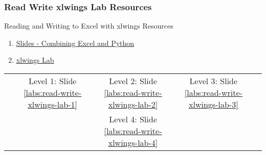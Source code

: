\documentclass[handout, 11pt]{beamer}
\begin{document}
\begin{frame}
\frametitle{Read Write xlwings Lab Resources}
{
\begin{block}{Reading and Writing to Excel with xlwings Resources}
\begin{enumerate}
\item \textcolor{blue}{\underline{\href{https://nickderobertis.github.io/fin-model-course/\_static/generated/pdfs/S9 Combining Excel and Python.pdf}{Slides - Combining Excel and Python}}}
\item \textcolor{blue}{\underline{\href{https://nickderobertis.github.io/fin-model-course/\_static/Materials for Lab Exercises/Connecting Python and Excel/xlwings/xlwings Lab.xlsx}{xlwings Lab}}}
\end{enumerate}
\vfill
\begin{tabular*}{\textwidth}{@{\extracolsep{\fill}}ccccc}
\toprule
\hfill & Level 1: Slide \textcolor{blue}{\underline{\ref{labs:read-write-xlwings-lab-1}}} & Level 2: Slide \textcolor{blue}{\underline{\ref{labs:read-write-xlwings-lab-2}}} & Level 3: Slide \textcolor{blue}{\underline{\ref{labs:read-write-xlwings-lab-3}}} & \hfill\\
\hfill &  & Level 4: Slide \textcolor{blue}{\underline{\ref{labs:read-write-xlwings-lab-4}}} &  & \hfill\\

\end{tabular*}
\end{block}
}
\label{labs:read-write-xlwings-lab-1-resources}
\end{frame}
\setcounter{framenumber}{\value{finalframe}}
\end{document}
